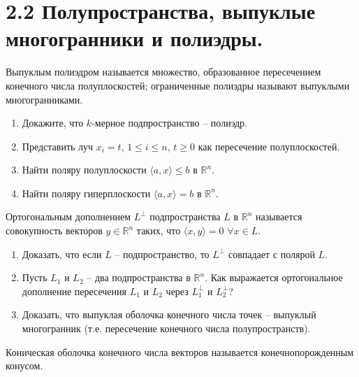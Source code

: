 	\section{2.2 Полупространства, выпуклые многогранники и полиэдры.}

	Выпуклым полиэдром называется множество, образованное пересечением конечного числа полуплоскостей; ограниченные полиэдры называют выпуклыми многогранниками.

	\begin{enumerate}
		\item Докажите, что $k$-мерное подпространство -- полиэдр.

		\item Представить луч $x_i = t$, $1 \le i \le n$, $t \ge 0$ как пересечение полуплоскостей.

		\item Найти поляру полуплоскости $\langle a, x \rangle \le b$ в $\mathbb{R}^n$.

		\item Найти поляру гиперплоскости $\langle a, x \rangle = b$ в $\mathbb{R}^n$.

	\end{enumerate}
	Ортогональным дополнением $L^\perp$ подпространства $L$ в $\mathbb{R}^n$ называется совокупность векторов $y \in \mathbb{R}^n$ таких, что $\langle x, y \rangle = 0$ $\forall x \in L$.  
	\begin{enumerate}[resume*]
		\item Доказать, что если $L$ -- подпространство, то $L^\perp$ совпадает с полярой $L$.
		\item Пусть $L_1$ и $L_2$ -- два подпространства в $\mathbb{R}^n$. Как выражается ортогональное дополнение пересечения $L_1$ и $L_2$ через $L_1^\perp$ и $L_2^\perp$?

		\item Доказать, что выпуклая оболочка конечного числа точек -- выпуклый многогранник (т.е. пересечение конечного числа полупространств).
	\end{enumerate}
	Коническая оболочка конечного числа  векторов называется конечнопорожденным конусом.
